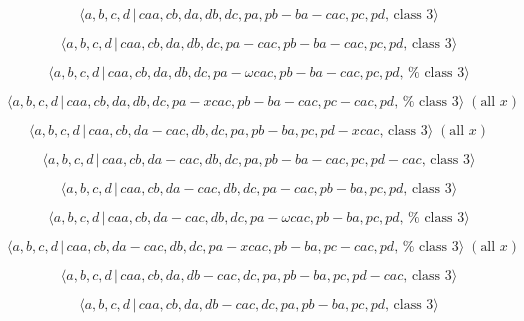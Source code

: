 \documentclass[10pt]{article}
\begin{document}
\begin{equation}
\langle a,b,c,d\,|\,caa,cb,da,db,dc,pa,pb-ba-cac,pc,pd,\,\text{class }%
3\rangle  \tag{7.3879}
\end{equation}

\begin{equation}
\langle a,b,c,d\,|\,caa,cb,da,db,dc,pa-cac,pb-ba-cac,pc,pd,\,\text{class }%
3\rangle  \tag{7.3880}
\end{equation}

\begin{equation}
\langle a,b,c,d\,|\,caa,cb,da,db,dc,pa-\omega cac,pb-ba-cac,pc,pd,\,\text{%
class }3\rangle  \tag{7.3881}
\end{equation}

\begin{equation}
\langle a,b,c,d\,|\,caa,cb,da,db,dc,pa-xcac,pb-ba-cac,pc-cac,pd,\,\text{%
class }3\rangle \;(\text{all }x)  \tag{7.3882}
\end{equation}

\begin{equation}
\langle a,b,c,d\,|\,caa,cb,da-cac,db,dc,pa,pb-ba,pc,pd-xcac,\,\text{class }%
3\rangle \;(\text{all }x)  \tag{7.3883}
\end{equation}

\begin{equation}
\langle a,b,c,d\,|\,caa,cb,da-cac,db,dc,pa,pb-ba-cac,pc,pd-cac,\,\text{class 
}3\rangle  \tag{7.3884}
\end{equation}

\begin{equation}
\langle a,b,c,d\,|\,caa,cb,da-cac,db,dc,pa-cac,pb-ba,pc,pd,\,\text{class }%
3\rangle  \tag{7.3885}
\end{equation}

\begin{equation}
\langle a,b,c,d\,|\,caa,cb,da-cac,db,dc,pa-\omega cac,pb-ba,pc,pd,\,\text{%
class }3\rangle  \tag{7.3886}
\end{equation}

\begin{equation}
\langle a,b,c,d\,|\,caa,cb,da-cac,db,dc,pa-xcac,pb-ba,pc-cac,pd,\,\text{%
class }3\rangle \;(\text{all }x)  \tag{7.3887}
\end{equation}

\begin{equation}
\langle a,b,c,d\,|\,caa,cb,da,db-cac,dc,pa,pb-ba,pc,pd-cac,\,\text{class }%
3\rangle  \tag{7.3888}
\end{equation}

\begin{equation}
\langle a,b,c,d\,|\,caa,cb,da,db-cac,dc,pa,pb-ba,pc,pd,\,\text{class }%
3\rangle  \tag{7.3889}
\end{equation}
\end{document}
